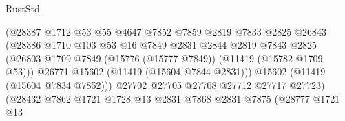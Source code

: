 \begin{lexlean}{RustStd}
\begin{coremodule}
                                          (@28387
                                            @1712
                                            @53
                                            @55
                                            @4647
                                            @7852
                                            @7859
                                            @2819
                                            @7833
                                            @2825
                                            @26843
                                            (@28386
                                              @1710
                                              @103
                                              @53
                                              @16
                                              @7849
                                              @2831
                                              @2844
                                              @2819
                                              @7843
                                              @2825
                                              (@26803
                                                @1709
                                                @7849
                                                (@15776 (@15777 @7849))
                                                (@11419 (@15782 @1709 @53)))
                                              @26771
                                              @15602
                                              (@11419 (@15604 @7844 @2831)))
                                            @15602
                                            (@11419 (@15604 @7834 @7852)))
                                          @27702
                                          @27705
                                          @27708
                                          @27712
                                          @27717
                                          @27723)
                                        (@28432
                                          @7862
                                          @1721
                                          @1728
                                          @13
                                          @2831
                                          @7868
                                          @2831
                                          @7875
                                          (@28777
                                            @1721
                                            @13

\end{coremodule}
\end{lexlean}
